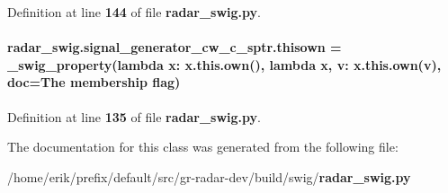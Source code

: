Definition at line {\bf 144} of file {\bf radar\+\_\+swig.\+py}.

\paragraph[{thisown}]{\setlength{\rightskip}{0pt plus 5cm}radar\+\_\+swig.\+signal\+\_\+generator\+\_\+cw\+\_\+c\+\_\+sptr.\+thisown = {\bf \+\_\+swig\+\_\+property}(lambda x\+: x.\+this.\+own(), lambda {\bf x}, v\+: x.\+this.\+own(v), doc=\textquotesingle{}The membership flag\textquotesingle{})\hspace{0.3cm}{\ttfamily [static]}}\label{classradar__swig_1_1signal__generator__cw__c__sptr_ab5d4d89600d73704b125d446f31245c1}


Definition at line {\bf 135} of file {\bf radar\+\_\+swig.\+py}.



The documentation for this class was generated from the following file\+:\begin{DoxyCompactItemize}
\item 
/home/erik/prefix/default/src/gr-\/radar-\/dev/build/swig/{\bf radar\+\_\+swig.\+py}\end{DoxyCompactItemize}
